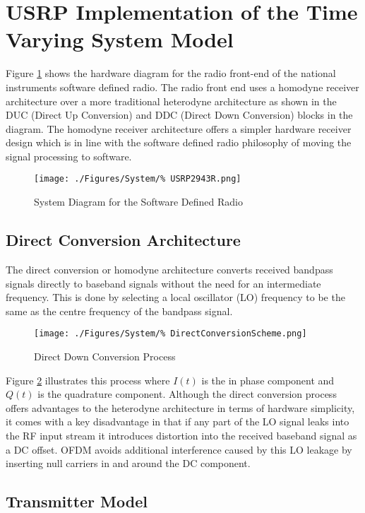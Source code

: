 \section{USRP Implementation of the Time Varying System Model}

Figure \ref{fig:USRPDiagram} shows the hardware diagram %
for the radio front-end of the national instruments %
software defined radio. The radio front end uses a homodyne %
receiver architecture over a more traditional heterodyne %
architecture as shown in the DUC (Direct Up Conversion) and %
DDC (Direct Down Conversion) blocks in the diagram. The homodyne %
receiver architecture offers a simpler hardware receiver design %
which is in line with the software defined radio philosophy of %
moving the signal processing to software.
\begin{figure}[ht]
	\texttt{[image: ./Figures/System/\%
	USRP2943R.png]}
	\caption{System Diagram for the Software Defined Radio%
	\cite{USRPDiagram}}
	\label{fig:USRPDiagram}
\end{figure}

\subsection{Direct Conversion Architecture}
\label{subsec:DirectConversion}
The direct conversion or homodyne architecture converts received %
bandpass signals directly to baseband signals without the need for %
an intermediate frequency. This is done by selecting a local %
oscillator (LO) frequency to be the same as the centre %
frequency of the bandpass signal.
\begin{figure}[ht]
	\centering
	\texttt{[image: ./Figures/System/\%
	DirectConversionScheme.png]}
	\caption{Direct Down Conversion Process}
	\label{fig:DDC}
\end{figure}
Figure \ref{fig:DDC} illustrates this process where $I(t)$ is the %
in phase component and $Q(t)$ is the quadrature component. %
Although the direct conversion process offers advantages to the %
heterodyne architecture in terms of hardware simplicity, it comes %
with a key disadvantage in that if any part of the LO signal %
leaks into the RF input stream it introduces distortion into the %
received baseband signal as a DC offset. OFDM avoids %
additional interference caused by this LO leakage by inserting %
null carriers in and around the DC component.

\subsection{Transmitter Model}

